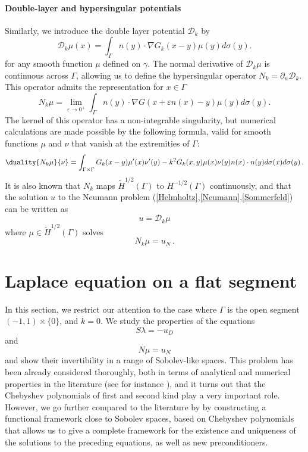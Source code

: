 \documentclass[a4paper]{article}
\begin{document}
	\paragraph{Double-layer and hypersingular potentials}
	Similarly, we introduce the double layer potential $\mathcal{D}_k$ by 
	\[\mathcal{D}_k \mu(x) = \int_{\Gamma} n(y) \cdot \nabla G_k(x-y) \mu(y) d\sigma(y).\]
	for any smooth function $\mu$ defined on $\gamma$.
	The normal derivative of $\mathcal{D}_k\mu$ is continuous across $\Gamma$, allowing us to define the hypersingular operator $N_k = \partial_n \mathcal{D}_k$. This operator admits the representation for $x\in \Gamma$
	\begin{equation}
	N_k \mu = \lim_{\varepsilon \to 0^+} \int_{\Gamma} n(y) \cdot \nabla G(x + \varepsilon n(x) - y) \mu(y) d\sigma(y).
	\label{defNk}
	\end{equation}
	The kernel of this operator has a non-integrable singularity, but numerical calculations are made possible by the following formula, valid for smooth functions $\mu$ and $\nu$ that vanish at the extremities of $\Gamma$: 
	\begin{equation}
	\duality{N_k \mu}{\nu} = \int_{\Gamma\times \Gamma} G_k(x-y) \mu'(x) \nu'(y) - k^2 G_k(x,y) \mu(x) \nu(y) n(x) \cdot n(y) d\sigma(x) d\sigma(y)\,.
	\label{NkenfonctiondeSk}
	\end{equation}
	It is also known that $N_k$ maps $\tilde{H}^{1/2}(\Gamma)$ to $H^{-1/2}(\Gamma)$ continuously, and that the solution $u$ to the Neumann problem (\ref{Helmholtz},\ref{Neumann},\ref{Sommerfeld}) can be written as
	\begin{equation}
	u = \mathcal{D}_k \mu
	\end{equation}
	where $\mu \in \tilde{H}^{1/2}(\Gamma)$ solves
	\begin{equation}
	N_k \mu = u_N\,.
	\label{Nkmu}
	\end{equation}  
	
	\section{Laplace equation on a flat segment}
	
	In this section, we restrict our attention to the case where $\Gamma$ is the open segment $(-1,1) \times \{0\}$, and $k=0$. We study the properties of the equations 
	\[S\lambda = -u_D\]
	and 
	\[N\mu = u_N\]
	and show their invertibility in a range of Sobolev-like spaces. This problem has been already considered thoroughly, both
	in terms of analytical and numerical properties in the literature (see for instance \cite{jiang2004second,bruno2012second}), and it turns out that the Chebyshev polynomials of first and second kind play a very important role. However, we go further compared to the literature by 
	by constructing a functional framework close to Sobolev spaces, based on Chebyshev polynomials that
	allows us to give a complete framework for the existence and uniqueness of the solutions to the preceding equations, as well as
	new preconditioners.
	
\end{document}
